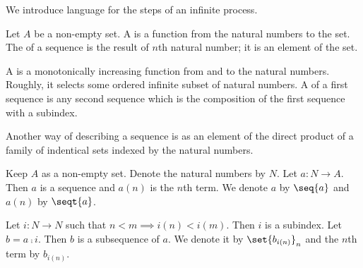 
\sbasic








\sstart
{}


We introduce language
for the steps of an
infinite process.


Let $A$ be a non-empty
set.
A 
is a function
from the natural numbers to the
set.
The  of a sequence
is the result of $n$th natural
number; it is an element of
the set.

A  is a monotonically
increasing function from and to the
natural numbers.
Roughly,
it
selects some ordered infinite
subset of natural numbers.
A  of a first
sequence is any second sequence
which is the composition of the
first sequence with a subindex.


Another way of describing a sequence
is as an element of the direct product
of a family of indentical sets indexed
by the natural numbers.


Keep $A$ as a non-empty set.
Denote the natural numbers by $N$.
Let $a: N \to A$.
Then $a$ is a sequence and
$a(n)$ is the $n$th term.
We denote $a$ by
$\seq{a}$ and $a(n)$ by $\seqt{a}$.

Let $i: N \to N$ such that
$n < m \implies i(n) < i(m)$.
Then $i$ is a subindex.
Let $b = a \comp i$.
Then $b$ is a subsequence of $a$.
We denote it by
$\set{b_{i(n)}}_n$ and the $n$th
term by $b_{i(n)}$.
\strats
